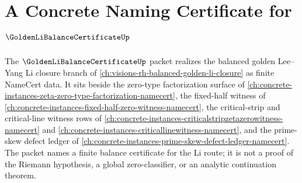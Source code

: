 \chapter{A Concrete Naming Certificate for $\GoldenLiBalanceCertificateUp$}
\label{ch:concrete-instances-golden-li-balance-certificate-namecert}

The $\GoldenLiBalanceCertificateUp$ packet realizes the balanced golden Lee--Yang Li closure branch of \autoref{ch:visions-rh-balanced-golden-li-closure} as finite NameCert data. It sits beside the zero-type factorization surface of \autoref{ch:concrete-instances-zeta-zero-type-factorization-namecert}, the fixed-half witness of \autoref{ch:concrete-instances-fixed-half-zero-witness-namecert}, the critical-strip and critical-line witness rows of \autoref{ch:concrete-instances-criticalstripzetazerowitness-namecert} and \autoref{ch:concrete-instances-criticallinewitness-namecert}, and the prime-skew defect ledger of \autoref{ch:concrete-instances-prime-skew-defect-ledger-namecert}. The packet names a finite balance certificate for the Li route; it is not a proof of the Riemann hypothesis, a global zero-classifier, or an analytic continuation theorem.


